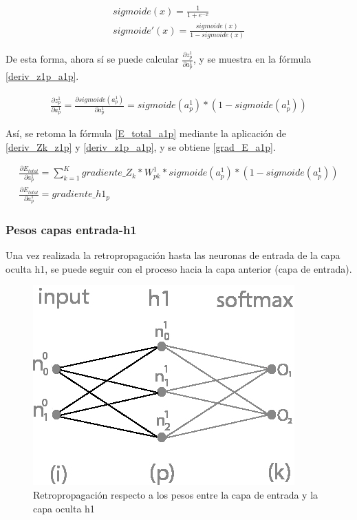 \begin{gather}
	sigmoide(x) = \frac{1}{1+e^{-x}} \label{grad_sig_1} \\
	sigmoide'(x) = \frac{sigmoide(x)}{1-sigmoide(x)} \label{grad_sig_2}
\end{gather}

De esta forma, ahora sí se puede calcular $\frac{\partial z^1_p}{\partial a^1_p}$, y se muestra en la fórmula \ref{deriv_z1p_a1p}.

\begin{gather}
	\frac{\partial z^1_ p}{\partial a^1_p} = \frac{\partial sigmoide(a^1_p)}{\partial a^1_p} = sigmoide(a^1_p)*(1-sigmoide(a^1_p))
	\label{deriv_z1p_a1p}
\end{gather}

Así, se retoma la fórmula \ref{E_total_a1p} mediante la aplicación de \ref{deriv_Zk_z1p} y \ref{deriv_z1p_a1p}, y se obtiene \ref{grad_E_a1p}.

\begin{gather}
	\frac{\partial E_{total}}{\partial a^1_p} = \sum_{k=1}^K  gradiente\_Z_k * W^1_{pk} * sigmoide(a^1_p)*(1-sigmoide(a^1_p)) \label{grad_E_a1p} \\
	\frac{\partial E_{total}}{\partial a^1_p} = gradiente\_h1_p
\end{gather}

\subsubsection{Pesos capas entrada-h1}

Una vez realizada la retropropagación hasta las neuronas de entrada de la capa oculta h1, se puede seguir con el proceso hacia la capa anterior (capa de entrada).

\begin{figure}[H]
	\centering
	\includegraphics[scale=0.35]{imagenes/nn_1_capa_pesos_input_h1.jpg}  
	\caption{Retropropagación respecto a los pesos entre la capa de entrada y la capa oculta h1}
	\label{fig:nn_1_pesos_input_h1}
\end{figure}


